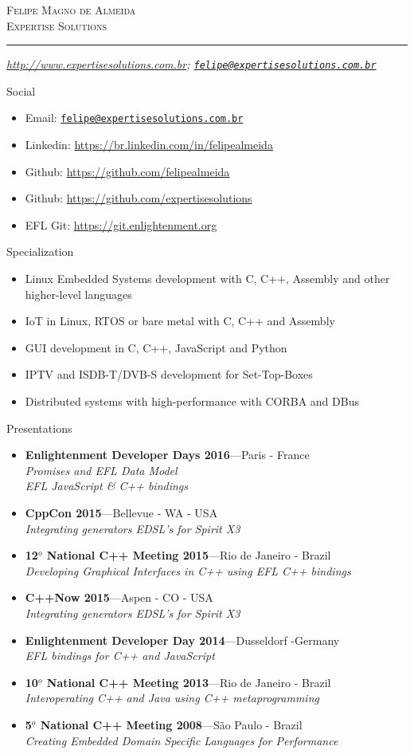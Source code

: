 \documentclass[10pt,oneside]{article}
\makeatletter
\newcommand{\name}{Felipe Magno de Almeida\\Expertise Solutions}
\newcommand{\addr}{}
\newcommand{\phone}{\url{http://www.expertisesolutions.com.br}}
\newcommand{\email}{\href{mailto:felipe@expertisesolutions.com.br}{\nolinkurl{felipe@expertisesolutions.com.br}}}
\newcommand{\bigname}[1]{
	\begin{center}\fontfamily{phv}\selectfont\Huge\scshape#1\end{center}
}
\newenvironment{ressection}[1]{
	\vspace{4pt}
	{\fontfamily{phv}\selectfont\Large#1}
	\begin{itemize}
	\vspace{3pt}
}{
	\end{itemize}
}
\newcommand{\resitem}[1]{
	\vspace{-4pt}
	\item \begin{flushleft} #1 \end{flushleft}
}
\newcommand{\resbigitem}[3]{
	\vspace{-5pt}
	\item
	\textbf{#1}---#2 \\
	\textit{#3}
}
\makeatother
\begin{document}
 \selectfont

\bigname{\name}

\vspace{-8pt} \rule{\textwidth}{1pt}

\vspace{-1pt} {\small\itshape \addr \hfill \phone; \email}

\vspace{8 pt}

\begin{ressection}{Social}
  \resitem{Email: \href{mailto:felipe@expertisesolutions.com.br}{\nolinkurl{felipe@expertisesolutions.com.br}}}
  \resitem{Linkedin: \url{https://br.linkedin.com/in/felipealmeida}}
  \resitem{Github: \url{https://github.com/felipealmeida}}
  \resitem{Github: \url{https://github.com/expertisesolutions}}
  \resitem{EFL Git: \url{https://git.enlightenment.org}}
\end{ressection}


\begin{ressection}{Specialization}
        \resitem{Linux Embedded Systems development with C, C++,
          Assembly and other higher-level languages}
        \resitem{IoT in Linux, RTOS or bare metal with C, C++ and Assembly}
	\resitem{GUI development in C, C++, JavaScript and Python}
        \resitem{IPTV and ISDB-T/DVB-S development for Set-Top-Boxes}
        \resitem{Distributed systems with high-performance with CORBA
          and DBus}
\end{ressection}


\begin{ressection}{Presentations}
  \resbigitem{Enlightenment Developer Days 2016}{Paris -
    France}{Promises and EFL Data Model \\ EFL JavaScript \& C++ bindings}
  \resbigitem{CppCon 2015}{Bellevue - WA -  USA}{Integrating generators EDSL's for Spirit X3}
  \resbigitem{12$^{\underline{o}}$ National C++ Meeting 2015}{Rio de Janeiro -
    Brazil}{Developing Graphical Interfaces in C++ using EFL C++ bindings}
  \resbigitem{C++Now 2015}{Aspen - CO - USA}{Integrating generators EDSL's for Spirit X3}
  \resbigitem{Enlightenment Developer Day 2014}{Dusseldorf -Germany}{EFL bindings for C++
    and JavaScript}
  \resbigitem{10$^{\underline{o}}$ National C++ Meeting 2013}{Rio de Janeiro -
    Brazil}{Interoperating C++ and Java using C++ metaprogramming}
  \resbigitem{5$^{\underline{o}}$ National C++ Meeting 2008}{São Paulo -
    Brazil}{Creating Embedded Domain Specific Languages for Performance}
\end{ressection}
\end{document}
